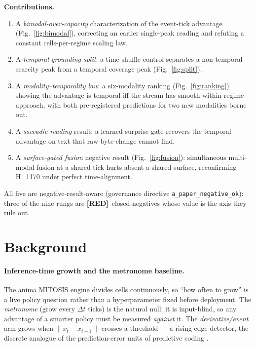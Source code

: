 \documentclass[11pt,a4paper]{article}
\providecommand{\tierRed}{\textbf{[RED]}}
\begin{document}
\medskip
\noindent\textbf{Contributions.}
\begin{enumerate}\itemsep0.3em
\item A \emph{bimodal-over-capacity} characterization of the event-tick advantage
  (Fig.~\ref{fig:bimodal}), correcting an earlier single-peak reading and refuting
  a constant cells-per-regime scaling law.
\item A \emph{temporal-grounding split}: a time-shuffle control separates a
  non-temporal scarcity peak from a temporal coverage peak (Fig.~\ref{fig:split}).
\item A \emph{modality--temporality law}: a six-modality ranking
  (Fig.~\ref{fig:ranking}) showing the advantage is temporal iff the stream has
  smooth within-regime approach, with both pre-registered predictions for two new
  modalities borne out.
\item A \emph{saccadic-reading} result: a learned-surprise gate recovers the
  temporal advantage on text that raw byte-change cannot find.
\item A \emph{surface-gated fusion} negative result (Fig.~\ref{fig:fusion}):
  simultaneous multi-modal fusion at a shared tick hurts absent a shared surface,
  reconfirming H\_1170 under perfect time-alignment.
\end{enumerate}

\medskip
\noindent All five are negative-result-aware (governance directive
\texttt{a\_paper\_negative\_ok}): three of the nine rungs are \tierRed\
closed-negatives whose value is the axis they rule out.

\section{Background}
\label{sec:bg}

\paragraph{Inference-time growth and the metronome baseline.}
The anima MITOSIS engine divides cells continuously, so ``how often to grow'' is a
live policy question rather than a hyperparameter fixed before deployment. The
\emph{metronome} (grow every $\Delta t$ ticks) is the natural null: it is input-blind,
so any advantage of a smarter policy must be measured \emph{against} it. The
\emph{derivative/event} arm grows when $\lVert x_t - x_{t-1}\rVert$ crosses a
threshold --- a rising-edge detector, the discrete analogue of the prediction-error
units of predictive coding \citep{rao1999predictive,spratling2017review}.
\end{document}
